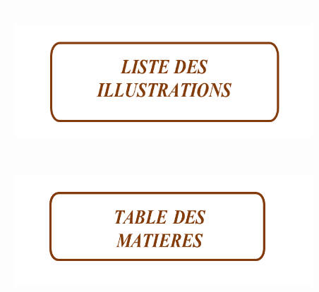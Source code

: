 \pagebreak

\begin{itemize}
  \item[\textcolor{white}{$\Box$}] 
\end{itemize}


\vspace{7cm}

\begin{figure}[H]
  \includegraphics{Images/list_illustration.png}
\end{figure}



\pagebreak



\listoftables

\pagebreak

\listoffigures

\pagebreak

\begin{itemize}
  \item[\textcolor{white}{$\Box$}] 
\end{itemize}


\vspace{7cm}

\begin{figure}[H]
  \includegraphics{Images/table_matiere.png}
\end{figure}



\pagebreak


\tableofcontents